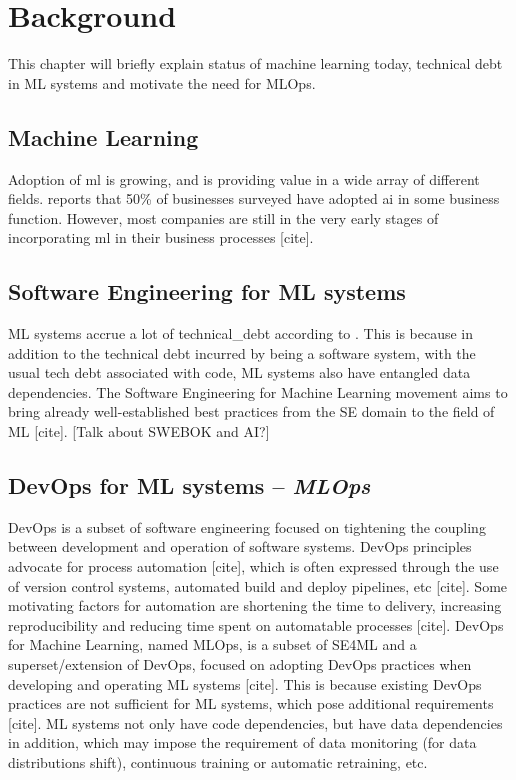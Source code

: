 \chapter{Background}
This chapter will briefly explain status of machine learning today, technical debt in ML systems and motivate the need for MLOps.

\section{Machine Learning}
Adoption of \acrshort{ml} is growing, and is providing value in a wide array of different fields.
\textcite{mckinsey2020} reports that 50\% of businesses surveyed have adopted \acrshort{ai} in some business function.
However, most companies are still in the very early stages of incorporating \acrshort{ml} in their business processes [cite].

\section{Software Engineering for ML systems}
ML systems accrue a lot of \gls{technical_debt} according to \textcite{Sculley2015}.
This is because in addition to the technical debt incurred by being a software system, with the usual tech debt associated with code, ML systems also have entangled data dependencies.
The Software Engineering for Machine Learning movement aims to bring already well-established best practices from the SE domain to the field of ML [cite].
[Talk about SWEBOK and AI?]

\section{DevOps for ML systems -- \emph{MLOps}}
DevOps is a subset of software engineering focused on tightening the coupling between development and operation of software systems.
DevOps principles advocate for process automation [cite], which is often expressed through the use of version control systems, automated build and deploy pipelines, etc [cite].
Some motivating factors for automation are shortening the time to delivery, increasing reproducibility and reducing time spent on automatable processes [cite].
DevOps for Machine Learning, named MLOps, is a subset of SE4ML and a superset/extension of DevOps, focused on adopting DevOps practices when developing and operating ML systems [cite].
This is because existing DevOps practices are not sufficient for ML systems, which pose additional requirements [cite].
ML systems not only have code dependencies, but have data dependencies in addition, which may impose the requirement of data monitoring (for data distributions shift), continuous training or automatic retraining, etc.

